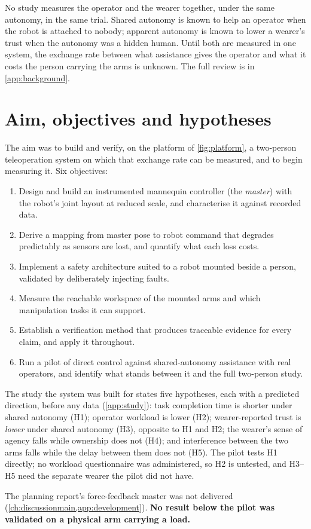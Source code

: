 No study measures the operator and the wearer together, under the same
autonomy, in the same trial. Shared autonomy is known to help an operator
when the robot is attached to nobody; apparent autonomy is known to lower a
wearer's trust when the autonomy was a hidden human. Until both are
measured in one system, the exchange rate between what assistance gives the
operator and what it costs the person carrying the arms is unknown. The
full review is in \cref{app:background}.

\section{Aim, objectives and hypotheses}
\label{sec:aim}

The aim was to build and verify, on the platform of \cref{fig:platform}, a
two-person teleoperation system on which that exchange rate can be
measured, and to begin measuring it. Six objectives:

\begin{enumerate}
  \item Design and build an instrumented mannequin controller (the
    \emph{master}) with the robot's joint layout at reduced scale, and
    characterise it against recorded data.
  \item Derive a mapping from master pose to robot command that degrades
    predictably as sensors are lost, and quantify what each loss costs.
  \item Implement a safety architecture suited to a robot mounted beside a
    person, validated by deliberately injecting faults.
  \item Measure the reachable workspace of the mounted arms and which
    manipulation tasks it can support.
  \item Establish a verification method that produces traceable evidence
    for every claim, and apply it throughout.
  \item Run a pilot of direct control against shared-autonomy assistance
    with real operators, and identify what stands between it and the full
    two-person study.
\end{enumerate}

The study the system was built for states five hypotheses, each with a
predicted direction, before any data (\cref{app:study}): task completion
time is shorter under shared autonomy (H1); operator workload is lower
(H2); wearer-reported trust is \emph{lower} under shared autonomy (H3),
opposite to H1 and H2; the wearer's sense of agency falls while ownership
does not (H4); and interference between the two arms falls while the delay
between them does not (H5). The pilot tests H1 directly; no workload
questionnaire was administered, so H2 is untested, and H3--H5 need the
separate wearer the pilot did not have.

The planning report's force-feedback master was not delivered
(\cref{ch:discussionmain,app:development}). \textbf{No result below the
pilot was validated on a physical arm carrying a load.}
